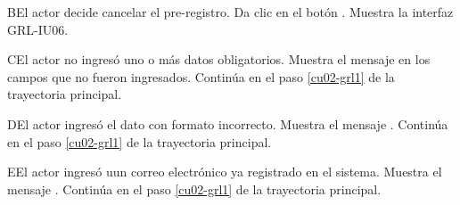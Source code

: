 \begin{UCtrayectoriaA}{B}{El actor decide cancelar el pre-registro.}
	\UCpaso [\UCactor] Da clic en el botón .
	\UCpaso [\UCsist] Muestra la interfaz GRL-IU06.
\end{UCtrayectoriaA} 

\begin{UCtrayectoriaA}{C}{El actor no ingresó uno o más datos obligatorios.}
	\UCpaso [\UCsist] Muestra el mensaje  en los campos que no
	fueron ingresados.
	\UCpaso [\UCsist] Continúa en el paso \ref{cu02-grl1} de la trayectoria principal.
\end{UCtrayectoriaA} 

\begin{UCtrayectoriaA}{D}{El actor ingresó el dato con formato incorrecto.}
	\UCpaso [\UCsist] Muestra el mensaje .
	\UCpaso [\UCsist] Continúa en el paso \ref{cu02-grl1} de la trayectoria principal.
\end{UCtrayectoriaA} 

\begin{UCtrayectoriaA}{E}{El actor ingresó uun correo electrónico ya registrado en el sistema.}
	\UCpaso [\UCsist] Muestra el mensaje .
	\UCpaso [\UCsist] Continúa en el paso \ref{cu02-grl1} de la trayectoria principal.
\end{UCtrayectoriaA} 